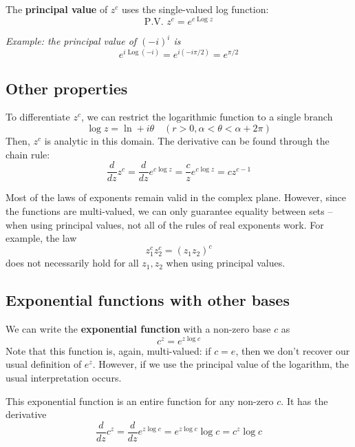 \documentclass{article}
\renewcommand{\emph}{\textbf}
\DeclareMathOperator{\Log}{Log}
\begin{document}
The \emph{principal value} of $z^c$ uses the single-valued log function:
\[
	\text{P.V. } z^c = e^{c \Log z}
\]

\textit{Example: the principal value of $(-i)^i$ is
\[
	e^{i \Log(-i)}
	= e^{i(-i \pi/2)}
	= e^{\pi / 2}
\]}

\subsection{Other properties}
To differentiate $z^c$, we can restrict the logarithmic function to a single branch
\[
	\log z = \ln + i\theta	\quad (r > 0, \alpha < \theta < \alpha + 2\pi)
\]
Then, $z^c$ is analytic in this domain. The derivative can be found through the chain rule:
\[
	\frac{d}{dz} z^c
	= \frac{d}{dz} e^{c \log z}
	= \frac{c}{z} e^{c \log z}
	= c z^{c-1}
\]

Most of the laws of exponents remain valid in the complex plane. However, since the functions are multi-valued, we can only guarantee equality between sets -- when using principal values, not all of the rules of real exponents work. For example, the law
\[
	z_1^c z_2^c = (z_1 z_2)^c
\]
does not necessarily hold for all $z_1, z_2$ when using principal values.

\subsection{Exponential functions with other bases}
We can write the \emph{exponential function} with a non-zero base $c$ as
\[
	c^z = e^{z \log c}
\]
Note that this function is, again, multi-valued: if $c = e$, then we don't recover our usual definition of $e^z$. However, if we use the principal value of the logarithm, the usual interpretation occurs.

This exponential function is an entire function for any non-zero $c$. It has the derivative
\[
	\frac{d}{dz} c^z 
	= \frac{d}{dz} e^{z \log c}
	= e^{z \log c} \log c
	= c^z \log c
\]
\end{document}
